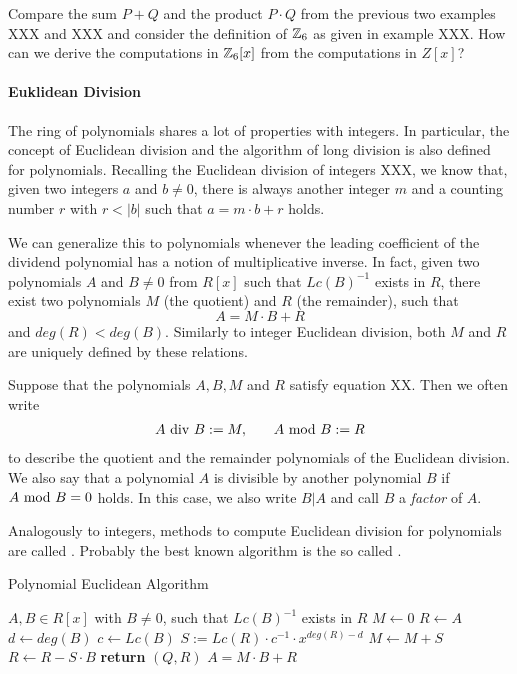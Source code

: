 \begin{exercise}
Compare the sum $P+Q$ and the product $P\cdot Q$ from the previous two examples XXX and XXX and consider the definition of $\mathbb{Z}_6$ as given in example XXX. How can we derive the computations in $\mathbb{Z}_6[x]$ from the computations in $Z[x]$? 
\end{exercise}
\paragraph{Euklidean Division}
The ring of polynomials shares a lot of properties with  integers. In particular, the concept of Euclidean division and the algorithm of long division is also defined for polynomials. Recalling the Euclidean division of integers XXX, we know that, given two integers $a$ and $b\neq 0$, there is always another integer $m$ and a counting number $r$ with $r<|b|$ such that $a = m\cdot b +r$ holds.

We can generalize this to polynomials whenever the leading coefficient of the dividend polynomial has a notion of multiplicative inverse. In fact, given two polynomials $A$ and $B\neq 0$ from $R[x]$ such that $Lc(B)^{-1}$ exists in $R$, there exist two polynomials $M$ (the quotient) and $R$ (the remainder), such that
\begin{equation}
A = M\cdot B + R
\end{equation}
and $deg(R) < deg(B)$. Similarly to integer Euclidean division, both $M$ and $R$ are uniquely defined by these relations. 
\begin{notation}
\label{eq_polynomial_euklidean_division_notation}
Suppose that the polynomials $ A, B, M $ and $ R $ satisfy equation XX. Then we often write 
\begin{equation}
\label{def_polynom_division_and_modulus}
\begin{array}{lcr}
A \text{ div } B: = M, & & A \text{ mod } B: = R 
\end{array}
\end{equation}
to describe the quotient and the remainder polynomials of the Euclidean division. We also say that a polynomial $ A $ is divisible by another polynomial $ B $ if $ A \text{ mod } B = 0 $ holds. In this case, we also write $ B | A $ and call $B$ a \textit{factor} of $A$.
\end{notation}
Analogously to integers, methods to compute Euclidean division for polynomials are called . Probably the best known algorithm is the so called . 
\begin{algorithm}\caption{Polynomial Euclidean Algorithm}
\label{alg_polynom_euclid_alg}
\begin{algorithmic}[0]
\Require $A,B \in R[x]$ with $B\neq 0$, such that $Lc(B)^{-1}$ exists in $R$
\State $M \gets 0$
\State $R \gets A$
\State $d \gets deg(B)$
\State $c \gets Lc(B)$
\State  $S := Lc(R)\cdot c^{-1}\cdot x^{deg(R)-d}$
\State $M \gets M + S$
\State $R \gets R - S\cdot B$
\EndWhile
\State \textbf{return} $(Q, R)$ 
\EndProcedure
\Ensure $ A=  M \cdot B + R$
\end{algorithmic}
\end{algorithm}

